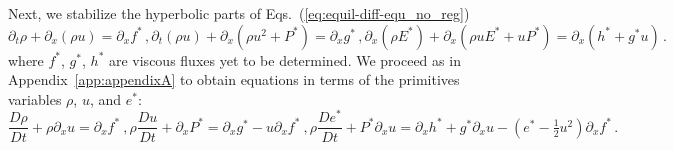 \documentclass[review]{elsarticle}
\newcommand{\eqts}[1]{Eqs.~(\ref{#1})}                     %
\newcommand{\app}[1]{Appendix~\ref{#1}}                     %
\newcommand{\matder}[1]{\frac{D #1}{Dt}}
\begin{document}
\begin{appendices}
Next, we stabilize the hyperbolic parts of \eqts{eq:equil-diff-equ_no_reg}
%
\begin{subequations}
\label{eq:equil-diff-equ_with_reg}
%
\begin{equation}
\partial_t \rho + \partial_x \left( \rho u \right) = \partial_x f^* \, ,
\end{equation}
%
\begin{equation}
\partial_t \left( \rho u \right) + \partial_x \left( \rho u^2 + P^* \right) = \partial_x g^* \, , 
\end{equation}
%
\begin{equation}
\partial_x \left( \rho E^* \right) + \partial_x \left( \rho u E^* + u P^* \right) =  \partial_x \left( h^* + g^* u \right) \, . 
\end{equation}
%
\end{subequations}
%
where $f^*$, $g^*$, $h^*$ are viscous fluxes yet to be determined. We proceed as in \app{app:appendixA} to obtain equations in terms 
of the primitives variables $\rho$, $u$, and $e^*$:
%
\begin{subequations}
\label{eq:equil-diff-equ_with_reg_prim}
%
\begin{equation} \label{eq:equil-diff-equ_with_reg_prim_rho}
\matder \rho + \rho \partial_x  u  = \partial_x f^* \ ,
\end{equation}
%
\begin{equation}
\rho \matder u   + \partial_x  P^*  = \partial_x g^* - u \partial_x f^* \ , 
\end{equation}
%
\begin{equation} \label{eq:equil-diff-equ_with_reg_prim_e}
\rho \matder {e^*}  +  P^* \partial_x u  =  \partial_x h^* + g^* \partial_x u - \left( e^* - \tfrac 1 2 u^2 \right) \partial_x  f^*\, . 
\end{equation}
%
\end{subequations}


\end{appendices}
\end{document}
